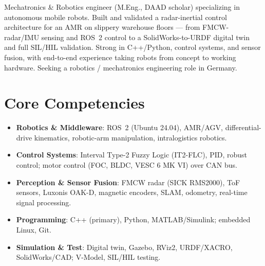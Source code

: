 \documentclass[11pt,a4paper,sans]{moderncv}
\begin{document}
\makecvtitle


\vspace{6pt}
\small{Mechatronics \& Robotics engineer (M.Eng., DAAD scholar) specializing in autonomous mobile robots. Built and validated a radar-inertial control architecture for an AMR on slippery warehouse floors --- from FMCW-radar/IMU sensing and ROS~2 control to a SolidWorks-to-URDF digital twin and full SIL/HIL validation. Strong in C++/Python, control systems, and sensor fusion, with end-to-end experience taking robots from concept to working hardware. Seeking a robotics / mechatronics engineering role in Germany.}


\section{Core Competencies}
\vspace{1pt}
\begin{itemize}

\item \textbf{Robotics \& Middleware}: ROS~2 (Ubuntu 24.04), AMR/AGV, differential-drive kinematics, robotic-arm manipulation, intralogistics robotics.

\item \textbf{Control Systems}: Interval Type-2 Fuzzy Logic (IT2-FLC), PID, robust control; motor control (FOC, BLDC, VESC 6 MK VI) over CAN bus.

\item \textbf{Perception \& Sensor Fusion}: FMCW radar (SICK RMS2000), ToF sensors, Luxonis OAK-D, magnetic encoders, SLAM, odometry, real-time signal processing.

\item \textbf{Programming}: C++ (primary), Python, MATLAB/Simulink; embedded Linux, Git.

\item \textbf{Simulation \& Test}: Digital twin, Gazebo, RViz2, URDF/XACRO, SolidWorks/CAD; V-Model, SIL/HIL testing.

\end{itemize}

\end{document}
